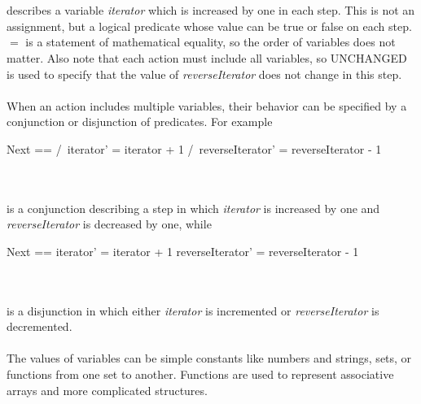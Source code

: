 \documentclass{uit-thesis}
\begin{document}
\begin{tlatex}
\end{tlatex}
\\\\
describes a variable \textit{iterator} which is increased by one in each step. This is not an assignment, but a logical predicate whose value can be true or false on each step. $=$ is a statement of mathematical equality, so the order of variables does not matter. Also note that each action must include all variables, so UNCHANGED is used to specify that the value of \textit{reverseIterator} does not change in this step.
\\\\
When an action includes multiple variables, their behavior can be specified by a conjunction or disjunction of predicates. For example
\begin{tla}
    Next ==
        /\ iterator' = iterator + 1
        /\ reverseIterator' = reverseIterator - 1
\end{tla}
\begin{tlatex}
%
%
%
\end{tlatex}
\\\\
is a conjunction describing a step in which \textit{iterator} is increased by one and \textit{reverseIterator} is decreased by one, while
\begin{tla}
    Next ==
        \/ iterator' = iterator + 1
        \/ reverseIterator' = reverseIterator - 1
\end{tla}
\begin{tlatex}
%
%
%
\end{tlatex}
\\\\
is a disjunction in which either \textit{iterator} is incremented or \textit{reverseIterator} is decremented.
\\\\
The values of variables can be simple constants like numbers and strings, sets, or functions from one set to another. Functions are used to represent associative arrays and more complicated structures.
\end{document}
